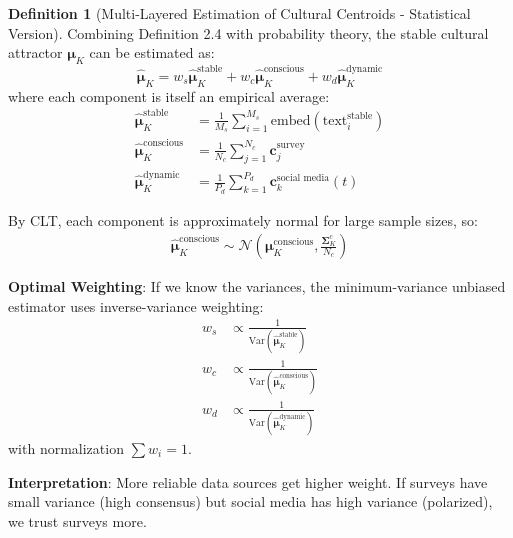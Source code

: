 \documentclass[11pt,a4paper]{article}
\theoremstyle{definition}
\newtheorem{definition}{Definition}[section]
\theoremstyle{remark}
\newcommand{\cc}{\mathbf{c}}
\begin{document}
\begin{definition}[Multi-Layered Estimation of Cultural Centroids - Statistical Version]
Combining Definition 2.4 with probability theory, the stable cultural attractor \(\boldsymbol{\mu}_K\) can be estimated as:
\begin{equation}
\hat{\boldsymbol{\mu}}_K = w_s \hat{\boldsymbol{\mu}}_K^{\text{stable}} + w_c \hat{\boldsymbol{\mu}}_K^{\text{conscious}} + w_d \hat{\boldsymbol{\mu}}_K^{\text{dynamic}}
\end{equation}
where each component is itself an empirical average:
\begin{align}
\hat{\boldsymbol{\mu}}_K^{\text{stable}} &= \frac{1}{M_s} \sum_{i=1}^{M_s} \text{embed}(\text{text}_i^{\text{stable}}) \\
\hat{\boldsymbol{\mu}}_K^{\text{conscious}} &= \frac{1}{N_c} \sum_{j=1}^{N_c} \cc_j^{\text{survey}} \\
\hat{\boldsymbol{\mu}}_K^{\text{dynamic}} &= \frac{1}{P_d} \sum_{k=1}^{P_d} \cc_k^{\text{social media}}(t)
\end{align}

By CLT, each component is approximately normal for large sample sizes, so:
\begin{align}
\hat{\boldsymbol{\mu}}_K^{\text{conscious}} \sim \mathcal{N}\left(\boldsymbol{\mu}_K^{\text{conscious}}, \frac{\boldsymbol{\Sigma}_K^c}{N_c}\right)
\end{align}

\textbf{Optimal Weighting}: If we know the variances, the minimum-variance unbiased estimator uses inverse-variance weighting:
\begin{align}
w_s &\propto \frac{1}{\text{Var}(\hat{\boldsymbol{\mu}}_K^{\text{stable}})} \\
w_c &\propto \frac{1}{\text{Var}(\hat{\boldsymbol{\mu}}_K^{\text{conscious}})} \\
w_d &\propto \frac{1}{\text{Var}(\hat{\boldsymbol{\mu}}_K^{\text{dynamic}})}
\end{align}
with normalization \(\sum w_i = 1\).

\textbf{Interpretation}: More reliable data sources get higher weight. If surveys have small variance (high consensus) but social media has high variance (polarized), we trust surveys more.
\end{definition}
\end{document}
